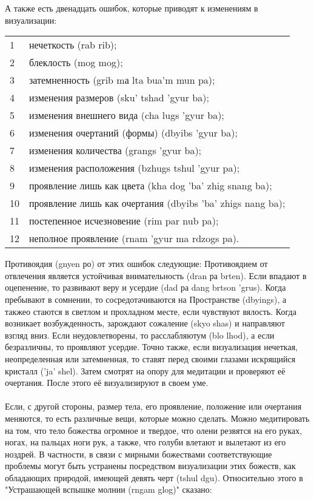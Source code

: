 А также есть двенадцать ошибок, которые приводят к изменениям в визуализации:\\

\begin{tabular}{ll}
1  & нечеткость (rab rib);\\
2  & блеклость (mog mog);\\
3  & затемненность (grib mа lta bua'm mun pa);\\
4  & изменения размеров (sku' tshad 'gyur ba);\\
5  & изменения внешнего вида (cha lugs 'gyur ba);\\
6  & изменения очертаний (формы) (dbyibs 'gyur ba);\\
7  & изменения количества (grangs 'gyur ba);\\
8  & изменения расположения (bzhugs tshul 'gyur pa);\\
9  & проявление лишь как цвета (kha dog 'ba' zhig snang ba);\\
10 & проявление лишь как очертания (dbyibs 'ba' zhigs nang ba);\\
11 & постепенное исчезновение (rim par nub pa);\\
12 & неполное проявление (rnam 'gyur ma rdzogs pa).
\end{tabular}

Противоядия (gnyen ро) от этих ошибок следующие: Противоядием от отвлечения
является устойчивая внимательность (dran ра brten). Если впадают в оцепенение, то
развивают веру и усердие (dad ра dang brtson 'grus). Когда пребывают в сомнении, то
сосредотачиваются на Пространстве (dbyings), а такжео стаются в светлом и прохладном
месте, если чувствуют вялость. Когда возникает возбужденность, зарождают сожаление (skyo
shas) и направляют взгляд вниз. Если неудовлетворены, то расслабляютум (blo lhod), а если
безразличны, то проявляют усердие. Точно также, если визуализация нечеткая,
неопределенная или затемненная, то ставят перед своими глазами искрящийся кристалл ('ja'
shel). Затем смотрят на опору для медитации и проверяют её очертания. После этого её
визуализируют в своем уме.\\
\\
Если, с другой стороны, размер тела, его проявление, положение или очертания
меняются, то есть различные вещи, которые можно сделать. Можно медитировать на том,
что тело божества огромное и твердое, что олени резвятся на его руках, ногах, на пальцах
ноги рук, а также, что голуби влетают и вылетают из его ноздрей. В частности, в связи с
мирными божествами соответствующие проблемы могут быть устранены посредством
визуализации этих божеств, как обладающих природой, имеющей девять черт (tshul dgu).
Относительно этого в "Устрашающей вспышке молнии (rngam glog)" сказано:

